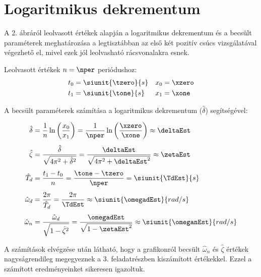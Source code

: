 \section{Logaritmikus dekrementum}

A 2. ábráról leolvasott értékek alapján a logaritmikus dekrementum és a becsült paraméterek meghatározása a legtisztábban az első két pozitív csúcs vizsgálatával végezhető el, mivel ezek jól leolvasható rácsvonalakra esnek.

Leolvasott értékek $n=\nper$ periódushoz:
\begin{align*}
    t_0 & = \siunit{\tzero}{s} & x_0 & = \xzero \\
    t_1 & = \siunit{\tone}{s}  & x_1 & = \xone
\end{align*}

A becsült paraméterek számítása a logaritmikus dekrementum ($\hat{\delta}$) segítségével:

\begin{align}
    \hat{\delta}   & = \frac{1}{n} \ln\left(\frac{x_0}{x_1}\right) = \frac{1}{\nper} \ln\left(\frac{\xzero}{\xone}\right) \approx \deltaEst          \\[1ex]
    \hat{\zeta}    & = \frac{\hat{\delta}}{\sqrt{4\pi^2 + \hat{\delta}^2}} = \frac{\deltaEst}{\sqrt{4\pi^2 + \deltaEst^2}} \approx \zetaEst          \\[1ex]
    \hat{T}_d      & = \frac{t_1 - t_0}{n} = \frac{\tone - \tzero}{\nper} = \siunit{\TdEst}{s}                                                       \\[1ex]
    \hat{\omega}_d & = \frac{2\pi}{\hat{T}_d} = \frac{2\pi}{\TdEst} \approx \siunit{\omegadEst}{rad/s}                                               \\[1ex]
    \hat{\omega}_n & = \frac{\hat{\omega}_d}{\sqrt{1 - \hat{\zeta}^2}} = \frac{\omegadEst}{\sqrt{1 - \zetaEst^2}} \approx \siunit{\omeganEst}{rad/s}
\end{align}

A számítások elvégzése után látható, hogy a grafikonról becsült $\hat{\omega}_n$ és $\hat{\zeta}$ értékek nagyságrendileg megegyeznek a 3. feladatrészben kiszámított értékekkel. Ezzel a számított eredményeinket sikeresen igazoltuk.